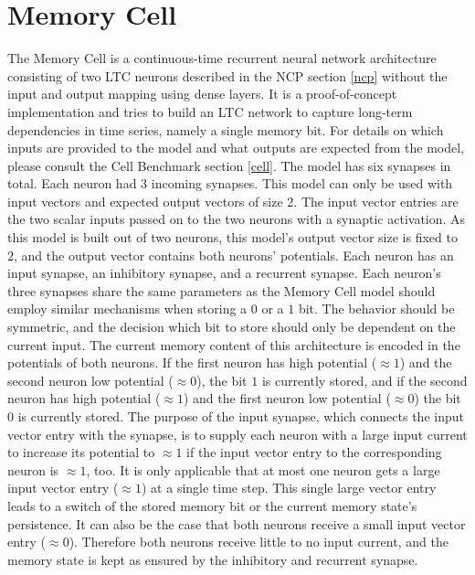 \documentclass[draft,final]{vutinfth} %
\begin{document}
    \section{Memory Cell} \label{memory_cell}
    The Memory Cell is a continuous-time recurrent neural network architecture consisting of two LTC neurons described in the NCP section \ref{ncp} without the input and output mapping using dense layers.
    It is a proof-of-concept implementation and tries to build an LTC network \cite{LTCNetworks} to capture long-term dependencies in time series, namely a single memory bit.
    For details on which inputs are provided to the model and what outputs are expected from the model, please consult the Cell Benchmark section \ref{cell}.
    The model has six synapses in total. Each neuron had $3$ incoming synapses.
    This model can only be used with input vectors and expected output vectors of size $2$.
    The input vector entries are the two scalar inputs passed on to the two neurons with a synaptic activation.
    As this model is built out of two neurons, this model's output vector size is fixed to $2$, and the output vector contains both neurons' potentials.
    Each neuron has an input synapse, an inhibitory synapse, and a recurrent synapse.
    Each neuron's three synapses share the same parameters as the Memory Cell model should employ similar mechanisms when storing a $0$ or a $1$ bit.
    The behavior should be symmetric, and the decision which bit to store should only be dependent on the current input.
    The current memory content of this architecture is encoded in the potentials of both neurons.
    If the first neuron has high potential ($\approx 1$) and the second neuron low potential ($\approx 0$), the bit $1$ is currently stored, and if the second neuron has high potential ($\approx 1$) and the first neuron low potential ($\approx 0$) the bit $0$ is currently stored.
    The purpose of the input synapse, which connects the input vector entry with the synapse, is to supply each neuron with a large input current to increase its potential to $\approx 1$ if the input vector entry to the corresponding neuron is $\approx 1$, too.
    It is only applicable that at most one neuron gets a large input vector entry ($\approx 1$) at a single time step.
    This single large vector entry leads to a switch of the stored memory bit or the current memory state's persistence.
    It can also be the case that both neurons receive a small input vector entry ($\approx 0$). Therefore both neurons receive little to no input current, and the memory state is kept as ensured by the inhibitory and recurrent synapse.
\end{document}
